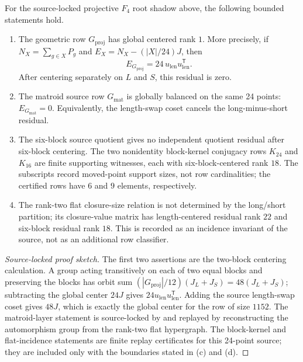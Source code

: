 \begin{proposition}
\label{prop:f4-source-layer}
For the source-locked projective \(F_4\) root shadow above, the following bounded statements hold.
\begin{enumerate}[label=\textup{(\alph*)},leftmargin=*]
  \item The geometric row \(G_{\mathrm{proj}}\) has global centered rank \(1\).  More precisely, if \(N_X=\sum_{g\in X}P_g\) and \(E_X=N_X-(|X|/24)J\), then
  \[
    E_{G_{\mathrm{proj}}}=24\,u_{\mathrm{len}}u_{\mathrm{len}}^{\mathsf T}.
  \]
  After centering separately on \(L\) and \(S\), this residual is zero.
  \item The matroid source row \(G_{\mathrm{mat}}\) is globally balanced on the same 24 points: \(E_{G_{\mathrm{mat}}}=0\).  Equivalently, the length-swap coset cancels the long-minus-short residual.
  \item The six-block source quotient gives no independent quotient residual after six-block centering.  The two nonidentity block-kernel conjugacy rows \(K_{24}\) and \(K_{16}\) are finite supporting witnesses, each with six-block-centered rank \(18\).  The subscripts record moved-point support sizes, not row cardinalities; the certified rows have \(6\) and \(9\) elements, respectively.
  \item The rank-two flat closure-size relation is not determined by the long/short partition; its closure-value matrix has length-centered residual rank \(22\) and six-block residual rank \(18\).  This is recorded as an incidence invariant of the source, not as an additional row classifier.
\end{enumerate}
\end{proposition}

\begin{proof}[Source-locked proof sketch]
The first two assertions are the two-block centering calculation.  A group acting transitively on each of two equal blocks and preserving the blocks has orbit sum \((|G_{\mathrm{proj}}|/12)(J_L+J_S)=48(J_L+J_S)\); subtracting the global center \(24J\) gives \(24u_{\mathrm{len}}u_{\mathrm{len}}^{\mathsf T}\).  Adding the source length-swap coset gives \(48J\), which is exactly the global center for the row of size \(1152\).  The matroid-layer statement is source-locked by \cite{FriedGerekGordonPerunicic2007F4Matroid} and replayed by reconstructing the automorphism group from the rank-two flat hypergraph.  The block-kernel and flat-incidence statements are finite replay certificates for this 24-point source; they are included only with the boundaries stated in (c) and (d).
\end{proof}

